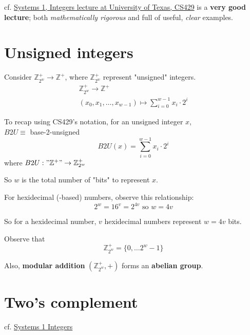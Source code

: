 \documentclass[10pt]{amsart}
\begin{document}
cf. \href{https://www.cs.utexas.edu/users/fussell/courses/cs429h/lectures/Lecture_3-429h.pdf}{Systems 1, Integers lecture at University of Texas, CS429} is a \textbf{very good lecture}; both \emph{mathematically rigorous} and full of useful, \emph{clear} examples.

\section{Unsigned integers}

Consider $\mathbb{Z}^+_{2^w} \to \mathbb{Z}^+$, where $\mathbb{Z}^+_{2^w}$ represent "unsigned" integers. 
\begin{equation}
\begin{gathered}
\mathbb{Z}^+_{2^w} \to \mathbb{Z}^+ \\ 
(x_0, x_1 , \dots , x_{w-1}) \mapsto \sum_{i=0}^{w-1} x_i \cdot 2^i 
\end{gathered}
\end{equation}

To recap using CS429's notation, for an unsigned integer $x$, \\
$B2U \equiv $ base-2-unsigned \\
\[
B2U(x) = \sum_{i=0}^{w-1} x_i \cdot 2^i 
\]
where $B2U : "\mathbb{Z}^+" \to \mathbb{Z}^+_{2^w}$

So $w$ is the total number of "bits" to represent $x$.



For hexidecimal (-based) numbers, observe this relationship: 
\begin{equation}
2^w = 16^v = 2^{4v} \text{ so } w =4v
\end{equation}

So for a hexidecimal number, $v$ hexidecimal numbers represent $w=4v$ bits. 

Observe that 
\begin{equation}
\mathbb{Z}^+_{2^w} = \lbrace 0 , \dots 2^w - 1 \rbrace 
\end{equation}

Also, \textbf{modular addition} $(\mathbb{Z}^+_{2^w}, +)$ forms an \textbf{abelian group}.

\section{Two's complement}

cf. \href{https://www.cs.utexas.edu/users/fussell/courses/cs429h/lectures/Lecture_3-429h.pdf}{Systems 1 Integers}
\end{document}
